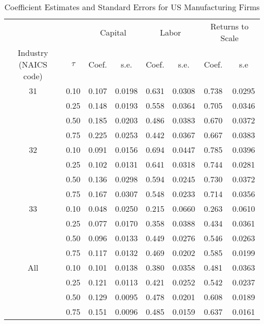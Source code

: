 \begin{table}[ht]
\centering
\caption{Coefficient Estimates and Standard Errors for US Manufacturing Firms} 
\begin{tabular}{cccccccc}
  \hline\hline & & \multicolumn{2}{c}{Capital}  & \multicolumn{2}{c}{Labor} & \multicolumn{2}{c}{Returns to Scale} \\ \cmidrule(lr){3-4} \cmidrule(lr){5-6} \cmidrule(lr){7-8}Industry (NAICS code) & $\tau$ & Coef. & s.e. & Coef. & s.e. & Coef. & s.e \\ 
  \hline
31 & 0.10 & 0.107 & 0.0198 & 0.631 & 0.0308 & 0.738 & 0.0295 \\ 
   & 0.25 & 0.148 & 0.0193 & 0.558 & 0.0364 & 0.705 & 0.0346 \\ 
   & 0.50 & 0.185 & 0.0203 & 0.486 & 0.0383 & 0.670 & 0.0372 \\ 
   & 0.75 & 0.225 & 0.0253 & 0.442 & 0.0367 & 0.667 & 0.0383 \\ 
  32 & 0.10 & 0.091 & 0.0156 & 0.694 & 0.0447 & 0.785 & 0.0396 \\ 
   & 0.25 & 0.102 & 0.0131 & 0.641 & 0.0318 & 0.744 & 0.0281 \\ 
   & 0.50 & 0.136 & 0.0298 & 0.594 & 0.0245 & 0.730 & 0.0372 \\ 
   & 0.75 & 0.167 & 0.0307 & 0.548 & 0.0233 & 0.714 & 0.0356 \\ 
  33 & 0.10 & 0.048 & 0.0250 & 0.215 & 0.0660 & 0.263 & 0.0610 \\ 
   & 0.25 & 0.077 & 0.0170 & 0.358 & 0.0388 & 0.434 & 0.0361 \\ 
   & 0.50 & 0.096 & 0.0133 & 0.449 & 0.0276 & 0.546 & 0.0263 \\ 
   & 0.75 & 0.117 & 0.0132 & 0.469 & 0.0202 & 0.585 & 0.0199 \\ 
  All & 0.10 & 0.101 & 0.0138 & 0.380 & 0.0358 & 0.481 & 0.0363 \\ 
   & 0.25 & 0.121 & 0.0113 & 0.421 & 0.0252 & 0.542 & 0.0237 \\ 
   & 0.50 & 0.129 & 0.0095 & 0.478 & 0.0201 & 0.608 & 0.0189 \\ 
   & 0.75 & 0.151 & 0.0096 & 0.485 & 0.0159 & 0.637 & 0.0161 \\ 
   \hline
\end{tabular}
\end{table}
